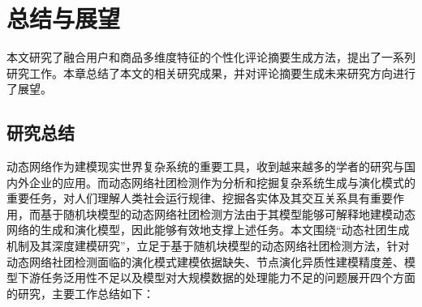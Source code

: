 %

\chapter{总结与展望}

\label{chap:8}


本文研究了融合用户和商品多维度特征的个性化评论摘要生成方法，提出了一系列研究工作。本章总结了本文的相关研究成果，并对评论摘要生成未来研究方向进行了展望。




\section{研究总结}

动态网络作为建模现实世界复杂系统的重要工具，收到越来越多的学者的研究与国内外企业的应用。而动态网络社团检测作为分析和挖掘复杂系统生成与演化模式的重要任务，对人们理解人类社会运行规律、挖掘各实体及其交互关系具有重要作用，而基于随机块模型的动态网络社团检测方法由于其模型能够可解释地建模动态网络的生成和演化模型，因此能够有效地支撑上述任务。本文围绕“动态社团生成机制及其深度建模研究”，立足于基于随机块模型的动态网络社团检测方法，针对动态网络社团检测面临的演化模式建模依据缺失、节点演化异质性建模精度差、模型下游任务泛用性不足以及模型对大规模数据的处理能力不足的问题展开四个方面的研究，主要工作总结如下：

